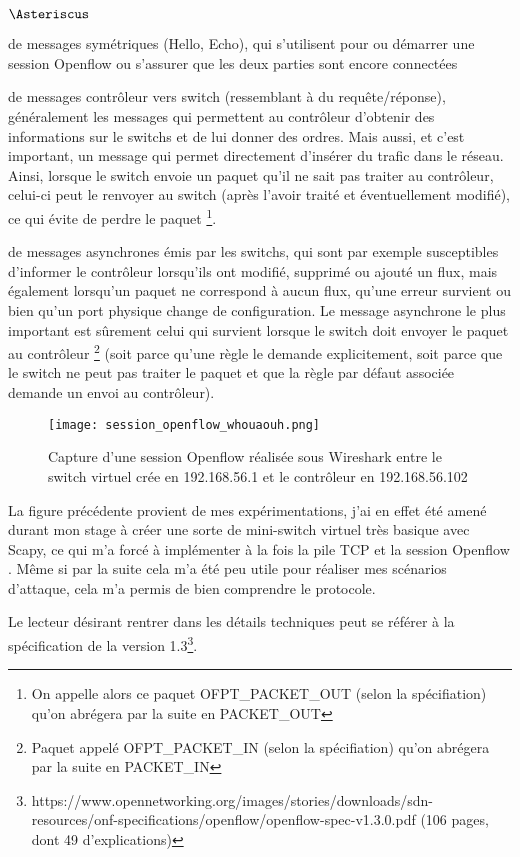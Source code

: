 \begin{list}{$\Asteriscus$}{}

\item de messages symétriques (Hello, Echo), qui s'utilisent pour ou démarrer une session Openflow ou s'assurer que les deux parties sont encore connectées

\item de messages contrôleur vers switch (ressemblant à du requête/réponse), généralement les messages qui permettent au contrôleur d'obtenir des informations sur le switchs et de lui donner des ordres. Mais aussi, et c'est important, un message qui permet directement d'insérer du trafic dans le réseau. Ainsi, lorsque le switch envoie un paquet qu'il ne sait pas traiter au contrôleur, celui-ci peut le renvoyer au switch (après l'avoir traité et éventuellement modifié), ce qui évite de perdre le paquet \footnote{On appelle alors ce paquet OFPT\_PACKET\_OUT (selon la spécifiation) qu'on abrégera par la suite en PACKET\_OUT}.

\item de messages asynchrones émis par les switchs, qui sont par exemple susceptibles d'informer le contrôleur lorsqu'ils ont modifié, supprimé ou ajouté un flux, mais également lorsqu'un paquet ne correspond à aucun flux, qu'une erreur survient ou bien qu'un port physique change de configuration. Le message asynchrone le plus important est sûrement celui qui survient lorsque le switch doit envoyer le paquet au contrôleur \footnote{Paquet appelé OFPT\_PACKET\_IN (selon la spécifiation) qu'on abrégera par la suite en PACKET\_IN} (soit parce qu'une règle le demande explicitement, soit parce que le switch ne peut pas traiter le paquet et que la règle par défaut associée demande un envoi au contrôleur).

\end{list}

\begin{figure}[h]
  	\centering
  	\texttt{[image: session\_openflow\_whouaouh.png]}
  	\caption{Capture d'une session Openflow réalisée sous Wireshark entre le switch virtuel crée en 192.168.56.1 et le contrôleur en 192.168.56.102}
\end{figure}

La figure précédente provient de mes expérimentations, j'ai en effet été amené durant mon stage à créer une sorte de mini-switch virtuel très basique avec Scapy, ce qui m'a forcé à implémenter à la fois la pile TCP et la session Openflow . Même si par la suite cela m'a été peu utile pour réaliser mes scénarios d'attaque, cela m'a permis de bien comprendre le protocole.

Le lecteur désirant rentrer dans les détails techniques peut se référer à la spécification de la version 1.3\footnote{\label{OF_13}https://www.opennetworking.org/images/stories/downloads/sdn-resources/onf-specifications/openflow/openflow-spec-v1.3.0.pdf (106 pages, dont 49 d'explications)}.